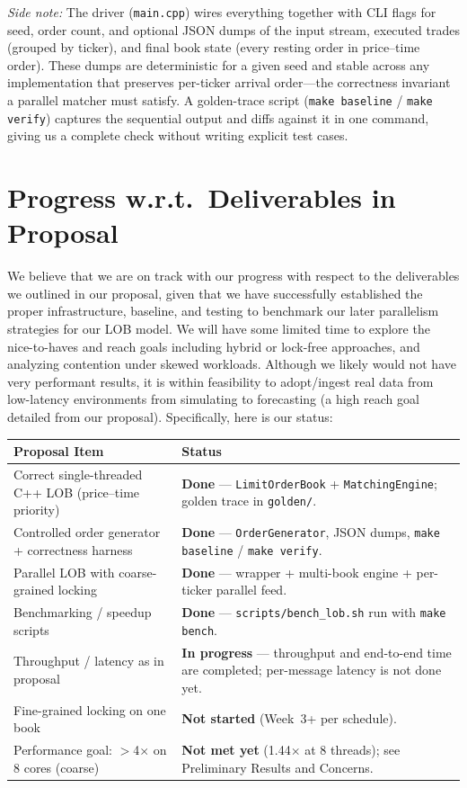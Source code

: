\documentclass[11pt]{article}
\begin{document}
\textit{Side note:} The driver (\texttt{main.cpp}) wires everything together with CLI flags for seed, order count, and optional JSON dumps of the input stream, executed trades (grouped by ticker), and final book state (every resting order in price--time order). These dumps are deterministic for a given seed and stable across any implementation that preserves per-ticker arrival order---the correctness invariant a parallel matcher must satisfy. A golden-trace script (\texttt{make baseline} / \texttt{make verify}) captures the sequential output and diffs against it in one command, giving us a complete check without writing explicit test cases.

\section*{Progress w.r.t.\ Deliverables in Proposal}

We believe that we are on track with our progress with respect to the deliverables we outlined in our proposal, given that we have successfully established the proper infrastructure, baseline, and testing to benchmark our later parallelism strategies for our LOB model. We will have some limited time to explore the nice-to-haves and reach goals including hybrid or lock-free approaches, and analyzing contention under skewed workloads. Although we likely would not have very performant results, it is within feasibility to adopt/ingest real data from low-latency environments from simulating to forecasting (a high reach goal detailed from our proposal). Specifically, here is our status:

\begin{table}[h]
\centering
\begin{tabular}{p{6.5cm} p{8cm}}
\toprule
\textbf{Proposal Item} & \textbf{Status} \\
\midrule
Correct single-threaded C++ LOB (price--time priority) & \textbf{Done} --- \texttt{LimitOrderBook} + \texttt{MatchingEngine}; golden trace in \texttt{golden/}. \\
Controlled order generator + correctness harness & \textbf{Done} --- \texttt{OrderGenerator}, JSON dumps, \texttt{make baseline} / \texttt{make verify}. \\
Parallel LOB with coarse-grained locking & \textbf{Done} --- wrapper + multi-book engine + per-ticker parallel feed. \\
Benchmarking / speedup scripts & \textbf{Done} --- \texttt{scripts/bench\_lob.sh} run with \texttt{make bench}. \\
Throughput / latency as in proposal & \textbf{In progress} --- throughput and end-to-end time are completed; per-message latency is not done yet. \\
Fine-grained locking on one book & \textbf{Not started} (Week~3+ per schedule). \\
Performance goal: $>$4$\times$ on 8 cores (coarse) & \textbf{Not met yet} (1.44$\times$ at 8 threads); see Preliminary Results and Concerns. \\
\bottomrule
\end{tabular}
\end{table}
\end{document}
